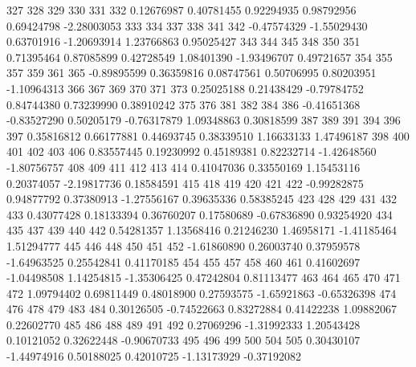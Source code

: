 \documentclass{article}
\begin{document}
\begin{Schunk}
\begin{Soutput}
        327         328         329         330         331         332 
 0.12676987  0.40781455  0.92294935  0.98792956  0.69424798 -2.28003053 
        333         334         337         338         341         342 
-0.47574329 -1.55029430  0.63701916 -1.20693914  1.23766863  0.95025427 
        343         344         345         348         350         351 
 0.71395464  0.87085899  0.42728549  1.08401390 -1.93496707  0.49721657 
        354         355         357         359         361         365 
-0.89895599  0.36359816  0.08747561  0.50706995  0.80203951 -1.10964313 
        366         367         369         370         371         373 
 0.25025188  0.21438429 -0.79784752  0.84744380  0.73239990  0.38910242 
        375         376         381         382         384         386 
-0.41651368 -0.83527290  0.50205179 -0.76317879  1.09348863  0.30818599 
        387         389         391         394         396         397 
 0.35816812  0.66177881  0.44693745  0.38339510  1.16633133  1.47496187 
        398         400         401         402         403         406 
 0.83557445  0.19230992  0.45189381  0.82232714 -1.42648560 -1.80756757 
        408         409         411         412         413         414 
 0.41047036  0.33550169  1.15453116  0.20374057 -2.19817736  0.18584591 
        415         418         419         420         421         422 
-0.99282875  0.94877792  0.37380913 -1.27556167  0.39635336  0.58385245 
        423         428         429         431         432         433 
 0.43077428  0.18133394  0.36760207  0.17580689 -0.67836890  0.93254920 
        434         435         437         439         440         442 
 0.54281357  1.13568416  0.21246230  1.46958171 -1.41185464  1.51294777 
        445         446         448         450         451         452 
-1.61860890  0.26003740  0.37959578 -1.64963525  0.25542841  0.41170185 
        454         455         457         458         460         461 
 0.41602697 -1.04498508  1.14254815 -1.35306425  0.47242804  0.81113477 
        463         464         465         470         471         472 
 1.09794402  0.69811449  0.48018900  0.27593575 -1.65921863 -0.65326398 
        474         476         478         479         483         484 
 0.30126505 -0.74522663  0.83272884  0.41422238  1.09882067  0.22602770 
        485         486         488         489         491         492 
 0.27069296 -1.31992333  1.20543428  0.10121052  0.32622448 -0.90670733 
        495         496         499         500         504         505 
 0.30430107 -1.44974916  0.50188025  0.42010725 -1.13173929 -0.37192082 

\end{Soutput}
\end{Schunk}
\end{document}
